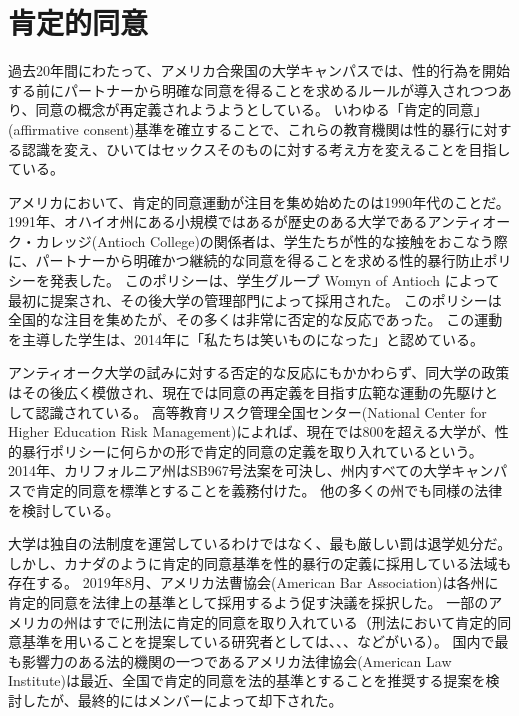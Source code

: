 \documentclass[paper=a4,book,openany]{jlreq}
\begin{document}
\section{肯定的同意}

過去20年間にわたって、アメリカ合衆国の大学キャンパスでは、性的行為を開始する前にパートナーから明確な同意を得ることを求めるルールが導入されつつあり、同意の概念が再定義されようようとしている。
いわゆる「肯定的同意」(affirmative consent)基準を確立することで、これらの教育機関は性的暴行に対する認識を変え、ひいてはセックスそのものに対する考え方を変えることを目指している。

アメリカにおいて、肯定的同意運動が注目を集め始めたのは1990年代のことだ。
1991年、オハイオ州にある小規模ではあるが歴史のある大学であるアンティオーク・カレッジ(Antioch College)の関係者は、学生たちが性的な接触をおこなう際に、パートナーから明確かつ継続的な同意を得ることを求める性的暴行防止ポリシーを発表した。
このポリシーは、学生グループ Womyn of Antioch によって最初に提案され、その後大学の管理部門によって採用された。
このポリシーは全国的な注目を集めたが、その多くは非常に否定的な反応であった。
この運動を主導した学生は、2014年に「私たちは笑いものになった」と認めている\citep{saltman14:_we_start_crusad_affir_consen}。

アンティオーク大学の試みに対する否定的な反応にもかかわらず、同大学の政策はその後広く模倣され、現在では同意の再定義を目指す広範な運動の先駆けとして認識されている。
高等教育リスク管理全国センター(National Center for Higher Education Risk Management)によれば、現在では800を超える大学が、性的暴行ポリシーに何らかの形で肯定的同意の定義を取り入れているという。
2014年、カリフォルニア州はSB967号法案を可決し、州内すべての大学キャンパスで肯定的同意を標準とすることを義務付けた。
他の多くの州でも同様の法律を検討している\citep{new14:_yes_means_yes_world}。

大学は独自の法制度を運営しているわけではなく、最も厳しい罰は退学処分だ。
しかし、カナダのように肯定的同意基準を性的暴行の定義に採用している法域も存在する。
2019年8月、アメリカ法曹協会(American Bar Association)は各州に肯定的同意を法律上の基準として採用するよう促す決議を採択した\citep[p.1]{domestic19:_repor_house_deleg}。
一部のアメリカの州はすでに刑法に肯定的同意を取り入れている（刑法において肯定的同意基準を用いることを提案している研究者としては、\citet{schulhofer98:_unwan_sex}、\citet{anderson05:_negot_sex}、\citet{decker11:_no_still_means_yes}などがいる）。
国内で最も影響力のある法的機関の一つであるアメリカ法律協会(American Law Institute)は最近、全国で肯定的同意を法的基準とすることを推奨する提案を検討したが、最終的にはメンバーによって却下された。
\end{document}

